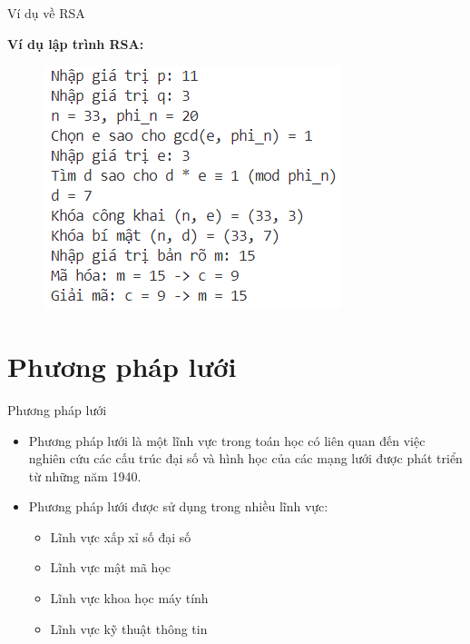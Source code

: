 \documentclass{beamer}
\numberwithin{equation}{section}
\begin{document}
\begin{frame}{Ví dụ về RSA}

\textbf{Ví dụ lập trình RSA:}

\begin{figure}[H]
\centering
\includegraphics[scale = 0.9]{pictures/lap_trinh_vi_du_RSA.png}
\end{figure}

\end{frame}
\section{Phương pháp lưới}
\begin{frame}{Phương pháp lưới}
\begin{itemize}
\item Phương pháp lưới là một lĩnh vực trong toán học có liên quan đến việc nghiên cứu các cấu trúc đại số và hình học của các mạng lưới được phát triển từ những năm 1940.
\item Phương pháp lưới được sử dụng trong nhiều lĩnh vực:
\begin{itemize}
\item Lĩnh vực xấp xỉ số đại số
\item Lĩnh vực mật mã học
\item Lĩnh vực khoa học máy tính
\item Lĩnh vực kỹ thuật thông tin
\end{itemize}
\end{itemize}
\end{frame}
\end{document}

